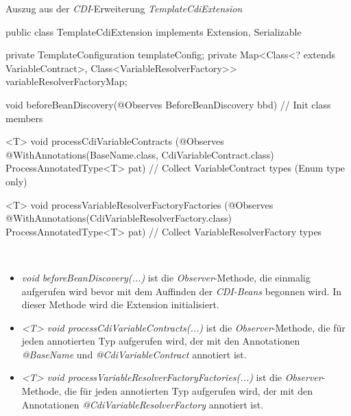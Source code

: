 \begin{program}[h]
\caption{Auszug aus der \emph{CDI}-Erweiterung \emph{TemplateCdiExtension}}
\label{prog:templateCdiExtension}
\begin{JavaCode}
public class TemplateCdiExtension implements Extension,
        Serializable {

    private TemplateConfiguration templateConfig;
    private Map<Class<? extends VariableContract>, 
                Class<VariableResolverFactory>>  
            variableResolverFactoryMap;

    void beforeBeanDiscovery(@Observes BeforeBeanDiscovery bbd) {
        // Init class members
    }

    <T> void processCdiVariableContracts
             (@Observes @WithAnnotations({BaseName.class, 
                                          CdiVariableContract.class}) 
             ProcessAnnotatedType<T> pat) {
       // Collect VariableContract types (Enum type only)
    }

    <T> void processVariableResolverFactoryFactories
        (@Observes @WithAnnotations(CdiVariableResolverFactory.class) 
        ProcessAnnotatedType<T> pat) {
        // Collect VariableResolverFactory types
    }
}
\end{JavaCode}
\end{program}
\ \newpage
\begin{itemize}
	\item\emph{void beforeBeanDiscovery(...)} 
	\newline
	ist die \emph{Observer}-Methode, die einmalig aufgerufen wird bevor mit dem Auffinden der \emph{CDI-Beans} begonnen wird. In dieser Methode wird die Extension initialisiert.
	\item\emph{<T> void processCdiVariableContracts(...)} 
	\newline
	ist die \emph{Observer}-Methode, die für jeden annotierten Typ aufgerufen wird, der mit den Annotationen \emph{@BaseName} und \emph{@CdiVariableContract} annotiert ist.
	\item\emph{<T> void processVariableResolverFactoryFactories(...)} 
	\newline
	ist die \emph{Observer}-Methode, die für jeden annotierten Typ aufgerufen wird, der mit den Annotationen \emph{@CdiVariableResolverFactory} annotiert ist.
\end{itemize}

